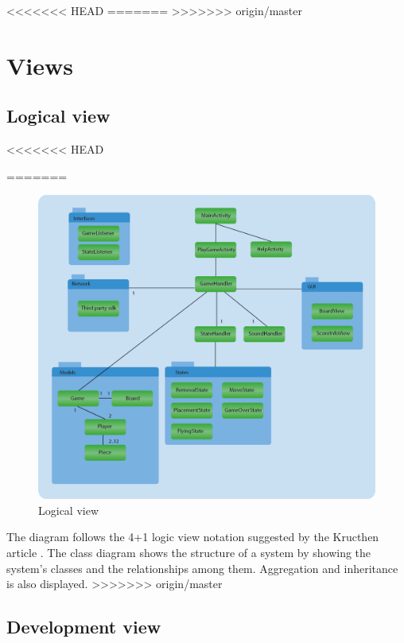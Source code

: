 <<<<<<< HEAD
=======
\pagebreak
>>>>>>> origin/master

\section{Views}

\subsection{Logical view}

<<<<<<< HEAD

=======
\begin{figure}[H]
\begin{center}
\includegraphics[width=\textwidth]{./Images/LogicalView.png}
\end{center}
\caption{Logical view}
\end{figure}

The diagram follows the 4+1 logic view notation suggested by the Kructhen article \cite{krutchen}. The class diagram shows the structure of a system by showing the system's classes  and the relationships among them. Aggregation and inheritance is also displayed.
>>>>>>> origin/master

\subsection{Development view}

